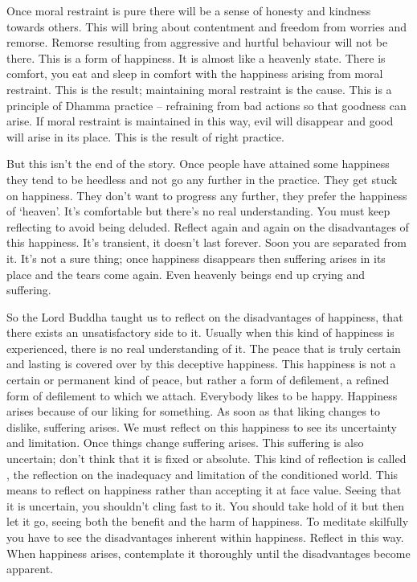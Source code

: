 Once moral restraint is pure there will be a sense of honesty and kindness towards others. This will bring about contentment and freedom from worries and remorse. Remorse resulting from aggressive and hurtful behaviour will not be there. This is a form of happiness. It is almost like a heavenly state. There is comfort, you eat and sleep in comfort with the happiness arising from moral restraint. This is the result; maintaining moral restraint is the cause. This is a principle of Dhamma practice -- refraining from bad actions so that goodness can arise. If moral restraint is maintained in this way, evil will disappear and good will arise in its place. This is the result of right practice.

But this isn't the end of the story. Once people have attained some happiness they tend to be heedless and not go any further in the practice. They get stuck on happiness. They don't want to progress any further, they prefer the happiness of `heaven'. It's comfortable but there's no real understanding. You must keep reflecting to avoid being deluded. Reflect again and again on the disadvantages of this happiness. It's transient, it doesn't last forever. Soon you are separated from it. It's not a sure thing; once happiness disappears then suffering arises in its place and the tears come again. Even heavenly beings end up crying and suffering.

So the Lord Buddha taught us to reflect on the disadvantages of happiness, that there exists an unsatisfactory side to it. Usually when this kind of happiness is experienced, there is no real understanding of it. The peace that is truly certain and lasting is covered over by this deceptive happiness. This happiness is not a certain or permanent kind of peace, but rather a form of defilement, a refined form of defilement to which we attach. Everybody likes to be happy. Happiness arises because of our liking for something. As soon as that liking changes to dislike, suffering arises. We must reflect on this happiness to see its uncertainty and limitation. Once things change suffering arises. This suffering is also uncertain; don't think that it is fixed or absolute. This kind of reflection is called , the reflection on the inadequacy and limitation of the conditioned world. This means to reflect on happiness rather than accepting it at face value. Seeing that it is uncertain, you shouldn't cling fast to it. You should take hold of it but then let it go, seeing both the benefit and the harm of happiness. To meditate skilfully you have to see the disadvantages inherent within happiness. Reflect in this way. When happiness arises, contemplate it thoroughly until the disadvantages become apparent.

